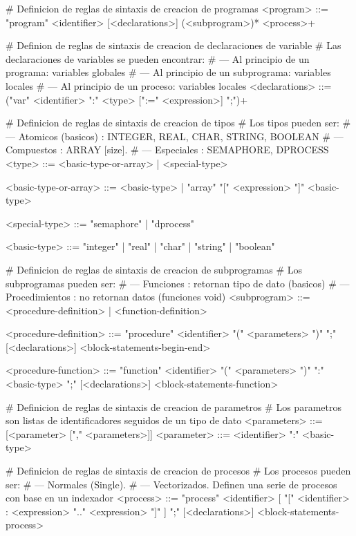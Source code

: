 \begin{BNFCode}
# Definicion de reglas de sintaxis de creacion de programas
<program> ::= "program" <identifier> [<declarations>] 
    (<subprogram>)* <process>+

# Definion de reglas de sintaxis de creacion de declaraciones de variable
# Las declaraciones de variables se pueden encontrar:
#  --- Al principio de un programa: variables globales
#  --- Al principio de un subprograma: variables locales
#  --- Al principio de un proceso: variables locales
<declarations> ::= ("var" <identifier> ":" <type> 
    [":=" <expression>] ";")+

# Definicion de reglas de sintaxis de creacion de tipos
# Los tipos pueden ser:
#  --- Atomicos (basicos) : INTEGER, REAL, CHAR, STRING, BOOLEAN
#  --- Compuestos : ARRAY [size].
#  --- Especiales : SEMAPHORE, DPROCESS
<type> ::= <basic-type-or-array>
    | <special-type>

<basic-type-or-array> ::= <basic-type>
    | "array" "[" <expression> "]" <basic-type>

<special-type> ::= "semaphore"
    | "dprocess"

<basic-type> ::= "integer"
    | "real"
    | "char"
    | "string"
    | "boolean"
 
# Definicion de reglas de sintaxis de creacion de subprogramas
# Los subprogramas pueden ser:
#  --- Funciones : retornan tipo de dato (basicos)
#  --- Procedimientos : no retornan datos (funciones void)
<subprogram> ::= <procedure-definition>
	| <function-definition>


<procedure-definition> ::= "procedure" <identifier> 
    "(" <parameters> ")" ";" [<declarations>] 
    <block-statements-begin-end>
	
<procedure-function> ::= "function" <identifier> 
    "(" <parameters> ")" ":" <basic-type>
    ";" [<declarations>] <block-statements-function>
    
# Definicion de reglas de sintaxis de creacion de parametros
# Los parametros son listas de identificadores seguidos de un tipo de dato
<parameters> ::= [<parameter> ["," <parameters>]]
<parameter> ::= <identifier> ":" <basic-type>

# Definicion de reglas de sintaxis de creacion de procesos
# Los procesos pueden ser:
#   --- Normales (Single).
#   --- Vectorizados. Definen una serie de procesos con base en un indexador
<process> ::= "process" <identifier> [ "[" <identifier> : 
    <expression> ".." <expression> "]" ] ";" 
    [<declarations>] <block-statements-process>



\end{BNFCode}
